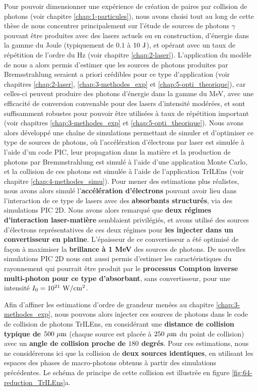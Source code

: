 \begin{refsection}
Pour pouvoir dimensionner une expérience de création de paires par collision de photons (voir chapitre \ref{chap:1-particules}), nous avons choisi tout au long de cette thèse de nous concentrer principalement sur l'étude de sources de photons $\gamma$ pouvant être produites avec des lasers actuels ou en construction, d'énergie dans la gamme du Joule (typiquement de $0.1$ à $10 ~ \rm J$), et opérant avec un taux de répétition de l'ordre du Hz (voir chapitre \ref{chap:2-laser}). L'application du modèle de \cite{ribeyre_2016} nous a alors permis d'estimer que les sources de photons produites par Bremsstrahlung seraient a priori crédibles pour ce type d'application (voir chapitres \ref{chap:2-laser}, \ref{chap:3-methodes_exp} et \ref{chap:5-opti_theorique}), car celles-ci peuvent produire des photons d'énergie dans la gamme du MeV, avec une efficacité de conversion convenable pour des lasers d'intensité modérées, et sont suffisamment robustes pour pouvoir être utilisées à taux de répétition important (voir chapitres \ref{chap:3-methodes_exp} et \ref{chap:5-opti_theorique}). Nous avons alors développé une chaîne de simulations permettant de simuler et d'optimiser ce type de sources de photons, où l'accélération d'électrons par laser est simulée à l'aide d'un code PIC, leur propagation dans la matière et la production de photons par Bremmstrahlung est simulé à l'aide d'une application Monte Carlo, et la collision de ces photons est simulée à l'aide de l'application TrILEns (voir chapitre \ref{chap:4-methodes_simu}). Pour mener des estimations plus réalistes, nous avons alors simulé l'\textbf{accélération d'électrons} pouvant avoir lieu dans l'interaction de ce type de lasers avec des \textbf{absorbants structurés}, via des simulations PIC 2D. Nous avons alors remarqué que \textbf{deux régimes d'interaction laser-matière} semblaient privilégiés, et avons utilisé des sources d'électrons représentatives de ces deux régimes pour \textbf{les injecter dans un convertisseur en platine}. L'épaisseur de ce convertisseur a été optimisé de façon à maximiser la \textbf{brillance à 1 MeV} des sources de photons. De nouvelles simulations PIC 2D nous ont aussi permis d'estimer les caractéristiques du rayonnement qui pourrait être produit par le \textbf{processus Compton inverse multi-photon pour ce type d'absorbant}, sans convertisseur, pour une intensité $I_0=10^{21} ~ \rm W/cm^2$. %

Afin d'affiner les estimations d'ordre de grandeur menées au chapitre \ref{chap:3-methodes_exp}, nous pouvons alors injecter ces sources de photons dans le code de collision de photons TrILEns, en considérant une \textbf{distance de collision typique de $500 ~ \rm \mu m$} (chaque source est placée à $250 ~ \rm \mu m$ du point de collision) avec un \textbf{angle de collision proche de $180$ degrés}. Pour ces estimations, nous ne considérerons ici que la collision de \textbf{deux sources identiques}, en utilisant les espaces des phases de macro-photons obtenus à partir des simulations précédentes. Le schéma de principe de cette collision est illustrée en figure \ref{fig:64-reduction_TrILEns}a.


\end{refsection}

